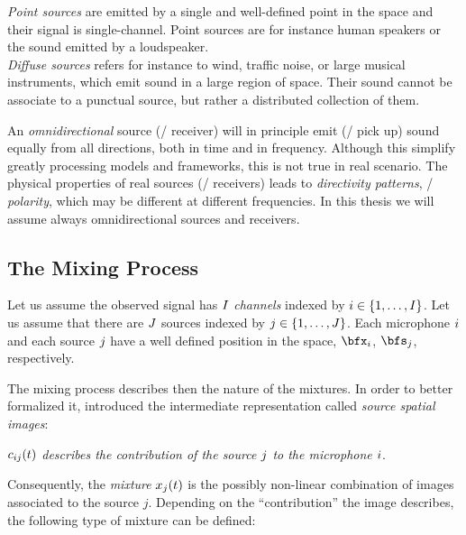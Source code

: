 \textit{Point sources} are emitted by a single and well-defined point in the space and their signal is single-channel.
Point sources are for instance human speakers or the sound emitted by a loudspeaker.
\\\textit{Diffuse sources} refers for instance to wind, traffic noise, or large musical instruments, which emit sound in a large region of space.
Their sound cannot be associate to a punctual source, but rather a distributed collection of them.

An \textit{omnidirectional} source (\resp/ receiver) will in principle emit (\resp/ pick up) sound equally from all directions,
both in time and in frequency.
Although this simplify greatly processing models and frameworks, this is not true in real scenario.
The physical properties of real sources (\resp/ receivers) leads to \textit{directivity patterns}, \aka/ \textit{polarity}, which may
be different at different frequencies.
In this thesis we will assume always omnidirectional sources and receivers.

\subsection{The Mixing Process}
Let us assume the observed signal has $I$ \textit{channels} indexed by $\idxMic \in \kbrace{1,\dots,\numMics}$.
Let us assume that there are $J$ sources indexed by $\idxSrc \in \kbrace{1,\dots,\numSrcs}$.
Each microphone $i$ and each source $j$ have a well defined position in the space, $\positionMicrophone_\idxMic$, $\positionSource_\idxSrc$, respectively.

The mixing process describes then the nature of the mixtures.
In order to better formalized it, \citeauthor{sturmel2012linear} introduced the intermediate representation called \emph{source spatial images}:
\begin{center}
    \textit{$c_{ij}(t)$ describes the contribution of the source $j$ to the microphone $i$}.
\end{center}
Consequently, the \textit{mixture} $x_{j}(t)$ is the possibly non-linear combination of images associated to the source $j$.
Depending on the ``contribution'' the image describes, the following type of mixture can be defined:

